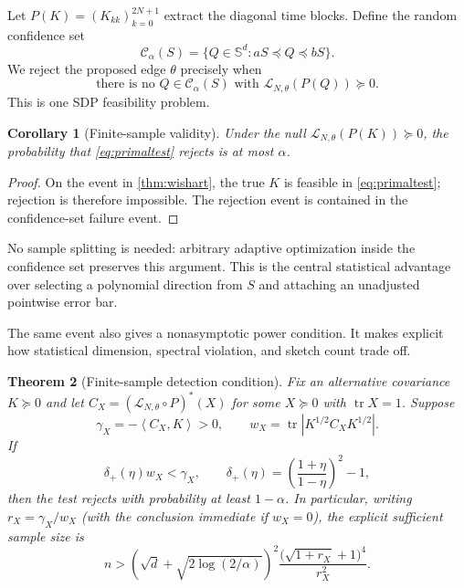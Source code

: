 \documentclass[11pt]{article}
\newtheorem{theorem}{Theorem}
\newtheorem{corollary}[theorem]{Corollary}
\newcommand{\Smat}{\mathbb{S}}
\newcommand{\tr}{\operatorname{tr}}
\newcommand{\ip}[2]{\left\langle #1,#2\right\rangle}
\begin{document}
Let $P(K)=(K_{kk})_{k=0}^{2N+1}$ extract the diagonal time blocks.  Define the
random confidence set
\begin{equation}
  \mathcal C_\alpha(S)=\{Q\in\Smat^d:aS\preceq Q\preceq bS\}.
\end{equation}
We reject the proposed edge $\theta$ precisely when
\begin{equation}
 \text{there is no }Q\in\mathcal C_\alpha(S)
 \text{ with }\mathcal L_{N,\theta}(P(Q))\succeq0.
 \label{eq:primaltest}
\end{equation}
This is one SDP feasibility problem.

\begin{corollary}[Finite-sample validity]
\label{cor:level}
Under the null $\mathcal L_{N,\theta}(P(K))\succeq0$, the probability that
\eqref{eq:primaltest} rejects is at most $\alpha$.
\end{corollary}

\begin{proof}
On the event in \cref{thm:wishart}, the true $K$ is feasible in
\eqref{eq:primaltest}; rejection is therefore impossible.  The rejection event
is contained in the confidence-set failure event.
\end{proof}

No sample splitting is needed: arbitrary adaptive optimization inside the
confidence set preserves this argument.  This is the central statistical
advantage over selecting a polynomial direction from $S$ and attaching an
unadjusted pointwise error bar.

The same event also gives a nonasymptotic power condition.  It makes explicit
how statistical dimension, spectral violation, and sketch count trade off.

\begin{theorem}[Finite-sample detection condition]
\label{thm:power}
Fix an alternative covariance $K\succeq0$ and let
$C_X=(\mathcal L_{N,\theta}\circ P)^*(X)$ for some $X\succeq0$ with
$\tr X=1$.
Suppose
\begin{equation}
 \gamma_X=-\ip{C_X}{K}>0,
 \qquad
 w_X=\tr\left|K^{1/2}C_XK^{1/2}\right|.
 \label{eq:populationmargin}
\end{equation}
If
\begin{equation}
 \delta_+(\eta)w_X<\gamma_X,
 \qquad
 \delta_+(\eta)=\left(\frac{1+\eta}{1-\eta}\right)^2-1,
 \label{eq:powercondition}
\end{equation}
then the test rejects with probability at least $1-\alpha$.  In particular,
writing $r_X=\gamma_X/w_X$ (with the conclusion immediate if $w_X=0$), the
explicit sufficient sample size is
\begin{equation}
 n>
 \left(\sqrt d+\sqrt{2\log(2/\alpha)}\right)^2
 \frac{\big(\sqrt{1+r_X}+1\big)^4}{r_X^2}.
 \label{eq:samplesufficient}
\end{equation}
\end{theorem}
\end{document}

